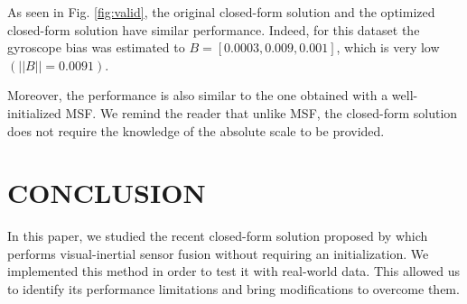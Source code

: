 \documentclass[letterpaper, 10 pt, journal, final]{ieeeconf}  %
\begin{document}
As seen in Fig. \ref{fig:valid}, the original closed-form solution and the optimized closed-form solution have similar performance.
Indeed, for this dataset the gyroscope bias was estimated to $B = [0.0003, 0.009, 0.001]$, which is very low $(||B|| = 0.0091)$.

Moreover, the performance is also similar to the one obtained with a well-initialized MSF.
We remind the reader that unlike MSF, the closed-form solution does not require the knowledge of the absolute scale to be provided.






\section{CONCLUSION}\label{SectionConclusion}


In this paper, we studied the recent closed-form solution proposed by \cite{Martinelli2014} which performs visual-inertial sensor fusion without requiring an initialization.
We implemented this method in order to test it with real-world data.
This allowed us to identify its performance limitations and bring modifications to overcome them.
\end{document}
